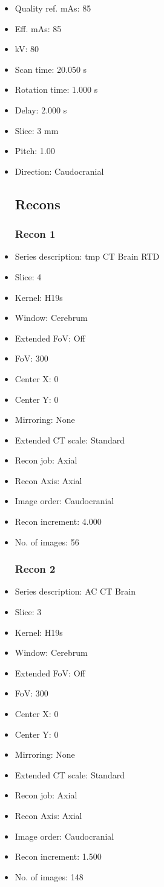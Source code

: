 \documentclass[12pt]{article}
\begin{document}
\begin{itemize}
\subsection{Scan}
\item Quality ref. mAs: 85\item Eff. mAs: 85\item kV: 80\item Scan time: 20.050 s\item Rotation time: 1.000 s\item Delay: 2.000 s\item Slice: 3 mm\item Pitch: 1.00\item Direction: Caudocranial\subsection{Recons}

\subsubsection{Recon 1}
\item Series description: tmp CT Brain RTD
\item Slice: 4
\item Kernel: H19s
\item Window: Cerebrum
\item Extended FoV: Off
\item FoV: 300
\item Center X: 0
\item Center Y: 0
\item Mirroring: None
\item Extended CT scale: Standard
\item Recon job: Axial
\item Recon Axis: Axial
\item Image order: Caudocranial
\item Recon increment: 4.000
\item No. of images: 56
\subsubsection{Recon 2}
\item Series description: AC CT Brain
\item Slice: 3
\item Kernel: H19s
\item Window: Cerebrum
\item Extended FoV: Off
\item FoV: 300
\item Center X: 0
\item Center Y: 0
\item Mirroring: None
\item Extended CT scale: Standard
\item Recon job: Axial
\item Recon Axis: Axial
\item Image order: Caudocranial
\item Recon increment: 1.500
\item No. of images: 148

\end{itemize}
\end{document}
